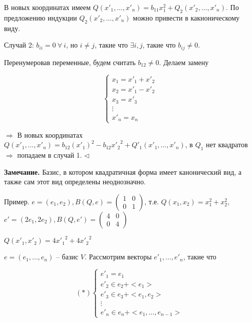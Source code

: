 В новых координатах имеем $Q(x'_1, \dots, x'_n) = b_{11}x_1^2 + Q_2 (x'_2, \dots, x'_n)$. По предложению индукции $Q_2(x'_2, \dots, x'_n)$ можно привести в какноническому виду.

Случай 2: $b_{ii} = 0 \ \forall \ i$, но $i \neq j$, такие что $\exists i, j$, такие что $b_{ij} \neq 0$.

Перенумеровав переменные, будем считать $b_{12} \neq 0$. Делаем замену 

\begin{equation*}
\begin{cases}
		x_1 = x'_1 + x'_2 \\
		x_2 = x'_1 - x'_2 \\
        x_3 = x'_3 \\
        \vdots \\
        x'_n = x_n
	\end{cases}
\end{equation*}

$\Rightarrow$ В новых координатах $Q(x'_1, \dots, x'_n) = b_{12} (x'_1)^2 - b_{12} {x'_2}^2 + Q'_1(x'_1, \dots, x'_n)$, в $Q_1$ нет квадратов $\Rightarrow$ попадаем в случай 1. $\lhd$

\vspace{\baselineskip}
\textbf{Замечание.} Базис, в котором квадратичная форма имеет канонический вид, а также сам этот вид определены неоднозначно.

\vspace{\baselineskip}
Пример. $e = (e_1, e_2), B(Q, e) = \begin{pmatrix} 1 & 0 \\ 0 & 1 \end{pmatrix}$, т.е. $Q(x_1, x_2) = x_1^2 + x_2^2$, $e' = (2e_1, 2e_2), B(Q, e') = \begin{pmatrix} 4 & 0 \\ 0 & 4 \end{pmatrix}$

$Q(x'_1, x'_2) = 4{x'_1}^2 + 4{x'_2}^2$

\vspace{\baselineskip}
$e = (e_1, \dots, e_n)$ -- базис $V$. Рассмотрим векторы $e'_1, \dots, e'_n$, такие что  

\begin{equation*}
(*) \begin{cases}
		e'_1 = e_1 \\
		e'_2 \in e_2 + <e_1> \\
        e'_3 \in e_3 + <e_1, e_2> \\
        \vdots \\
        e'_n \in e_n + <e_1, \dots, e_{n-1}>
	\end{cases}
\end{equation*}  

